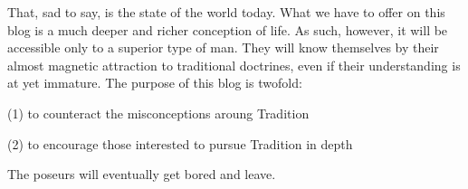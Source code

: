 \begin{footnotesize}
\begin{sffamily}
That, sad to say, is the state of the world today. What we have to offer on this blog is a much deeper and richer conception of life. As such, however, it will be accessible only to a superior type of man. They will know themselves by their almost magnetic attraction to traditional doctrines, even if their understanding is at yet immature. The purpose of this blog is twofold:

(1) to counteract the misconceptions aroung Tradition

(2) to encourage those interested to pursue Tradition in depth

The poseurs will eventually get bored and leave.

\hfill

\end{sffamily}
\end{footnotesize}

